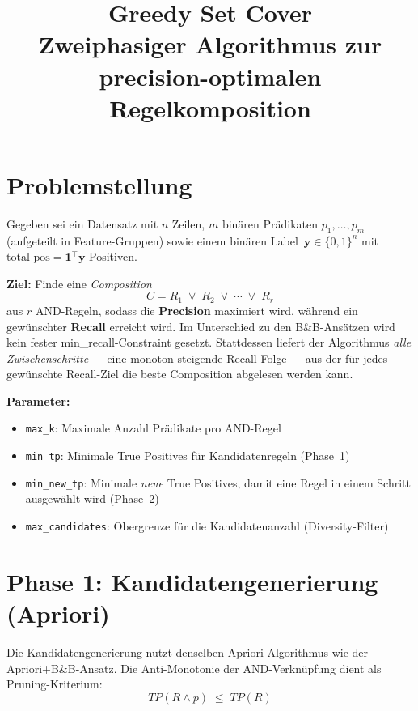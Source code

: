 \documentclass[11pt,a4paper]{article}
\title{Greedy Set Cover\\[0.3em]\large Zweiphasiger Algorithmus zur precision-optimalen Regelkomposition}
\author{}
\date{}
\begin{document}
\maketitle

\section{Problemstellung}

Gegeben sei ein Datensatz mit $n$ Zeilen, $m$ bin\"aren Pr\"adikaten $p_1, \dots, p_m$ (aufgeteilt in Feature-Gruppen) sowie einem bin\"aren Label~$\mathbf{y} \in \{0,1\}^n$ mit $\text{total\_pos} = \mathbf{1}^\top \mathbf{y}$ Positiven.

\medskip
\textbf{Ziel:} Finde eine \emph{Composition}
\[
  C = R_1 \;\lor\; R_2 \;\lor\; \cdots \;\lor\; R_r
\]
aus $r$ AND-Regeln, sodass die \textbf{Precision} maximiert wird, w\"ahrend ein gew\"unschter \textbf{Recall} erreicht wird. Im Unterschied zu den B\&B-Ans\"atzen wird kein fester min\_recall-Constraint gesetzt. Stattdessen liefert der Algorithmus \emph{alle Zwischenschritte} --- eine monoton steigende Recall-Folge --- aus der f\"ur jedes gew\"unschte Recall-Ziel die beste Composition abgelesen werden kann.

\medskip
\textbf{Parameter:}
\begin{itemize}[nosep]
  \item \texttt{max\_k}: Maximale Anzahl Pr\"adikate pro AND-Regel
  \item \texttt{min\_tp}: Minimale True Positives f\"ur Kandidatenregeln (Phase~1)
  \item \texttt{min\_new\_tp}: Minimale \emph{neue} True Positives, damit eine Regel in einem Schritt ausgew\"ahlt wird (Phase~2)
  \item \texttt{max\_candidates}: Obergrenze f\"ur die Kandidatenanzahl (Diversity-Filter)
\end{itemize}

\section{Phase 1: Kandidatengenerierung (Apriori)}

Die Kandidatengenerierung nutzt denselben Apriori-Algorithmus wie der Apriori+B\&B-Ansatz. Die Anti-Monotonie der AND-Verkn\"upfung dient als Pruning-Kriterium:
\[
  \mathit{TP}(R \land p) \;\leq\; \mathit{TP}(R)
\]
\end{document}
